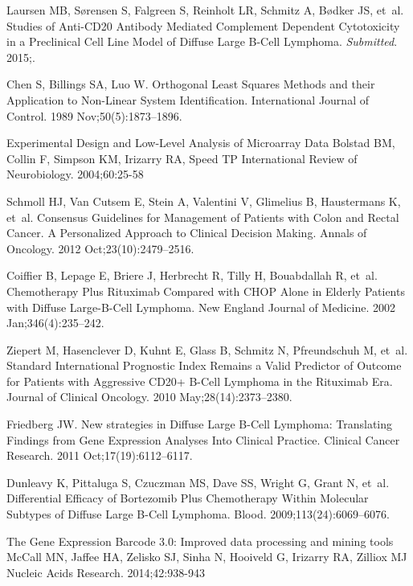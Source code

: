\documentclass[10pt,letterpaper]{article}
\begin{document}
\begin{thebibliography}{10}
Laursen MB, S{\o}rensen S, Falgreen S, Reinholt LR, Schmitz A, B{\o}dker JS,
  et~al.
\newblock Studies of Anti-{CD20} Antibody Mediated Complement Dependent
  Cytotoxicity in a Preclinical Cell Line Model of Diffuse Large {B}-Cell
  Lymphoma.
\newblock \textit{Submitted}. 2015;.

Chen S, Billings SA, Luo W.
\newblock Orthogonal Least Squares Methods and their Application to Non-Linear
  System Identification.
\newblock International Journal of Control. 1989 Nov;50(5):1873--1896.

Experimental Design and Low-Level Analysis of Microarray Data
\newblock Bolstad BM, Collin F, Simpson KM, Irizarry RA, Speed TP
\newblock International Review of Neurobiology. 2004;60:25-58


Schmoll HJ, {Van Cutsem} E, Stein A, Valentini V, Glimelius B, Haustermans K,
  et~al.
 Consensus Guidelines for Management of Patients with Colon and
  Rectal Cancer. {A} Personalized Approach to Clinical Decision Making.
\newblock Annals of Oncology. 2012 Oct;23(10):2479--2516.

Coiffier B, Lepage E, Briere J, Herbrecht R, Tilly H, Bouabdallah R, et~al.
 Chemotherapy Plus Rituximab Compared with {CHOP} Alone in
  Elderly Patients with Diffuse Large-{B}-Cell Lymphoma.
\newblock New England Journal of Medicine. 2002 Jan;346(4):235--242.

Ziepert M, Hasenclever D, Kuhnt E, Glass B, Schmitz N, Pfreundschuh M, et~al.
\newblock Standard International Prognostic Index Remains a Valid Predictor of
  Outcome for Patients with Aggressive {CD20+} {B}-Cell Lymphoma in the
  Rituximab Era.
\newblock Journal of Clinical Oncology. 2010 May;28(14):2373--2380.

Friedberg JW.
\newblock New strategies in Diffuse Large {B}-Cell Lymphoma: Translating
  Findings from Gene Expression Analyses Into Clinical Practice.
\newblock Clinical Cancer Research. 2011 Oct;17(19):6112--6117.

Dunleavy K, Pittaluga S, Czuczman MS, Dave SS, Wright G, Grant N, et~al.
\newblock Differential Efficacy of Bortezomib Plus Chemotherapy Within
  Molecular Subtypes of Diffuse Large {B}-Cell Lymphoma.
\newblock Blood. 2009;113(24):6069--6076.

The Gene Expression Barcode 3.0: Improved data processing and mining tools
\newblock McCall MN, Jaffee HA, Zelisko SJ, Sinha N, Hooiveld G, Irizarry RA, Zilliox MJ
\newblock Nucleic Acids Research. 2014;42:938-943



\end{thebibliography}
\end{document}
